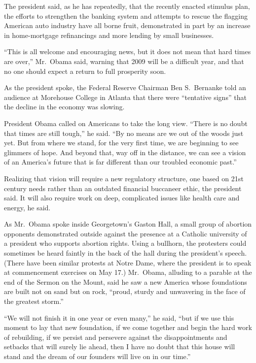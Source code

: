 \documentclass[12pt,a4paper,onecolumn]{article}
\begin{document}
The president said, as he has repeatedly, that the recently enacted stimulus plan, the efforts to
strengthen the banking system and attempts to rescue the flagging American auto industry have all
borne fruit, demonstrated in part by an increase in home-mortgage refinancings and more lending by
small businesses.

``This is all welcome and encouraging news, but it does not mean that hard times are over,''
Mr.~Obama said, warning that 2009 will be a difficult year, and that no one should expect a return
to full prosperity soon.

As the president spoke, the Federal Reserve Chairman Ben S.~Bernanke told an audience at Morehouse
College in Atlanta that there were ``tentative signs'' that the decline in the economy was slowing.

President Obama called on Americans to take the long view. ``There is no doubt that times are still
tough,'' he said. ``By no means are we out of the woods just yet. But from where we stand, for the
very first time, we are beginning to see glimmers of hope. And beyond that, way off in the distance,
we can see a vision of an America's future that is far different than our troubled economic past.''

Realizing that vision will require a new regulatory structure, one based on 21st century needs
rather than an outdated financial buccaneer ethic, the president said. It will also require work on
deep, complicated issues like health care and energy, he said.

As Mr.~Obama spoke inside Georgetown's Gaston Hall, a small group of abortion opponents demonstrated
outside against the presence at a Catholic university of a president who supports abortion rights.
Using a bullhorn, the protesters could sometimes be heard faintly in the back of the hall during the
president's speech. (There have been similar protests at Notre Dame, where the president is to speak
at commencement exercises on May 17.) Mr.~Obama, alluding to a parable at the end of the Sermon on
the Mount, said he saw a new America whose foundations are built not on sand but on rock, ``proud,
sturdy and unwavering in the face of the greatest storm.''

``We will not finish it in one year or even many,'' he said, ``but if we use this moment to lay that
new foundation, if we come together and begin the hard work of rebuilding, if we persist and
persevere against the disappointments and setbacks that will surely lie ahead, then I have no doubt
that this house will stand and the dream of our founders will live on in our time.''
\end{document}

